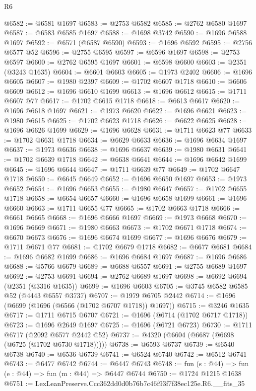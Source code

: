 \begin{lexlean}{R6}
\begin{coremodule}
@6582 := @6581 @1697
@6583 := @2753 @6582
@6585 := @2762 @6580 @1697
@6587 := @6583 @6585 @1697
@6588 := @1698 @3742
@6590 := @1696 @6588 @1697
@6592 := @6571 (@6587 @6590)
@6593 := @1696 @6592
@6595 := @2756 @6577 @52
@6596 := @2755 @6595
@6597 := @6596 @1697
@6598 := @2753 @6597
@6600 := @2762 @6595 @1697
@6601 := @6598 @6600
@6603 := @2351 (@3243 @1635)
@6604 := @6601 @6603
@6605 := @1973 @2402
@6606 := @1696 @6605
@6607 := @1980 @2397
@6609 := @1702 @6607 @1718
@6610 := @6606 @6609
@6612 := @1696 @6610 @1699
@6613 := @1696 @6612
@6615 := @1711 @6607 @77
@6617 := @1702 @6615 @1718
@6618 := @6613 @6617
@6620 := @1696 @6618 @1697
@6621 := @1973 @6620
@6622 := @1696 @6621
@6623 := @1980 @6615
@6625 := @1702 @6623 @1718
@6626 := @6622 @6625
@6628 := @1696 @6626 @1699
@6629 := @1696 @6628
@6631 := @1711 @6623 @77
@6633 := @1702 @6631 @1718
@6634 := @6629 @6633
@6636 := @1696 @6634 @1697
@6637 := @1973 @6636
@6638 := @1696 @6637
@6639 := @1980 @6631
@6641 := @1702 @6639 @1718
@6642 := @6638 @6641
@6644 := @1696 @6642 @1699
@6645 := @1696 @6644
@6647 := @1711 @6639 @77
@6649 := @1702 @6647 @1718
@6650 := @6645 @6649
@6652 := @1696 @6650 @1697
@6653 := @1973 @6652
@6654 := @1696 @6653
@6655 := @1980 @6647
@6657 := @1702 @6655 @1718
@6658 := @6654 @6657
@6660 := @1696 @6658 @1699
@6661 := @1696 @6660
@6663 := @1711 @6655 @77
@6665 := @1702 @6663 @1718
@6666 := @6661 @6665
@6668 := @1696 @6666 @1697
@6669 := @1973 @6668
@6670 := @1696 @6669
@6671 := @1980 @6663
@6673 := @1702 @6671 @1718
@6674 := @6670 @6673
@6676 := @1696 @6674 @1699
@6677 := @1696 @6676
@6679 := @1711 @6671 @77
@6681 := @1702 @6679 @1718
@6682 := @6677 @6681
@6684 := @1696 @6682 @1699
@6686 := @1696 @6684 @1697
@6687 := @1696 @6686
@6688 := @5766 @6679
@6689 := @6688 @6557
@6691 := @2755 @6689 @1697
@6692 := @2753 @6691
@6694 := @2762 @6689 @1697
@6698 := @6692 @6694 (@2351 (@3316 @1635))
@6699 := @1696 @6603
@6705 := @3745 @6582 @6585 @52 (@4443 @6557 @3737)
@6707 := @1979 @6705 @2442
@6714 := @1696 (@6699 (@1696 (@6566 (@1702 @6707 @1718)) @1697))
@6715 := @3246 @1635
@6717 := @1711 @6715 @6707
@6721 := @1696 (@6714 (@1702 @6717 @1718))
@6723 := @1696 @2649 @1697
@6725 := @1696 (@6721 @6723)
@6730 := @1711 @6717 (@2092 @6577 @2442 @52)
@6737 := @4320 (@6604 (@6687 (@6698 (@6725 (@1702 @6730 @1718)))))
@6738 := @6593 @6737
@6739 := @6540 @6738
@6740 := @6536 @6739
@6741 := @6524 @6740
@6742 := @6512 @6741
@6743 := @6477 @6742
@6744 := @6447 @6743
@6748 := fun (s : @44) => fun (e : @44) => fun (m : @44) => @6447 @6744
@6750 := @1724 @1215 @1638
@6751 := LexLeanPreserve.Ccc362dd0d0b76b7c46f93f7f38ec125e.R6.__fits_35

\end{coremodule}
\end{lexlean}
